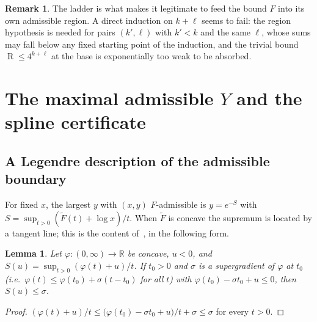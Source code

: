 \documentclass[11pt]{article}
\newtheorem{lemma}[theorem]{Lemma}
\theoremstyle{definition}
\newtheorem{remark}[theorem]{Remark}
\newcommand{\R}{\mathbb{R}}
\newcommand{\Ft}{\widetilde F}
\DeclareMathOperator{\Ram}{R}
\begin{document}
\begin{remark}
The ladder is what makes it legitimate to feed the bound $F$ into its own admissible region.  A direct induction on $k+\ell$ seems to fail: the region hypothesis is needed for pairs $(k',\ell)$ with $k'<k$ and the same $\ell$, whose sums may fall below any fixed starting point of the induction, and the trivial bound $\Ram\le4^{k+\ell}$ at the base is exponentially too weak to be absorbed.
\end{remark}

\section{The maximal admissible $Y$ and the spline certificate}\label{sec:cert}

\subsection{A Legendre description of the admissible boundary}

For fixed $x$, the largest $y$ with $(x,y)$ $F$-admissible is $y=e^{-S}$ with $S=\sup_{t>0}(\Ft(t)+\log x)/t$.  When $\Ft$ is concave the supremum is located by a tangent line; this is the content of~\cite[Lemma~15]{GNNW}, in the following form.

\begin{lemma}\label{lem:legendre}
Let $\varphi\colon(0,\infty)\to\R$ be concave, $u<0$, and $S(u)=\sup_{t>0}(\varphi(t)+u)/t$.  If $t_0>0$ and $\sigma$ is a supergradient of $\varphi$ at $t_0$ (i.e.\ $\varphi(t)\le\varphi(t_0)+\sigma(t-t_0)$ for all $t$) with $\varphi(t_0)-\sigma t_0+u\le0$, then $S(u)\le\sigma$.
\end{lemma}
\begin{proof}
$(\varphi(t)+u)/t\le\bigl(\varphi(t_0)-\sigma t_0+u\bigr)/t+\sigma\le\sigma$ for every $t>0$.
\end{proof}
\end{document}
